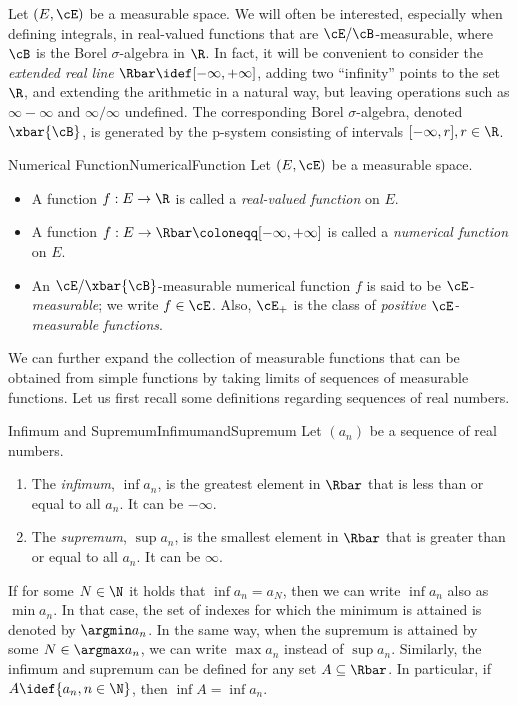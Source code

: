Let \((E, \cE)\) be a measurable space. We will often be interested, especially when defining integrals, in real-valued functions that are \(\cE/\cB\)-measurable, where \(\cB\) is the Borel \(\sigma\)-algebra in \(\R\). In fact, it will be convenient to consider the \textit{extended real line} \(\Rbar \idef [-\infty, +\infty]\), adding two ``infinity'' points to the set \(\R\), and extending the arithmetic in a natural way, but leaving operations such as \(\infty - \infty\) and \(\infty/\infty\) undefined. The corresponding Borel \(\sigma\)-algebra, denoted \(\xbar{\cB}\), is generated by the p-system consisting of intervals \([-\infty, r], r \in \R\).

\begin{defn}{Numerical Function}{NumericalFunction}
	Let \((E, \cE)\) be a measurable space.
	\begin{itemize}
		\item A function \(f : E \to \R\) is called a \textit{real-valued function} on \(E\).
		\item A function \(f : E \to \Rbar \coloneqq [-\infty, +\infty]\) is called a \textit{numerical function} on \(E\).
		\item An \(\cE/\xbar{\cB}\)-measurable numerical function \(f\) is said to be \textit{\(\cE\)-measurable}; we write \(f \in \cE\). Also, \(\cE_+\) is the class of \textit{positive \(\cE\)-measurable functions}.
	\end{itemize}
\end{defn}

We can further expand the collection of measurable functions that can be obtained from simple functions by taking limits of sequences of measurable functions. Let us first recall some definitions regarding sequences of real numbers.

\begin{defn}{Infimum and Supremum}{InfimumandSupremum}
	Let \((a_n)\) be a sequence of real numbers.
	\begin{enumerate}
		\item The \textit{infimum}, \(\inf a_n\), is the greatest element in \(\Rbar\) that is less than or equal to all \(a_n\). It can be \(-\infty\).
		\item The \textit{supremum}, \(\sup a_n\), is the smallest element in \(\Rbar\) that is greater than or equal to all \(a_n\). It can be \(\infty\).
	\end{enumerate}
\end{defn}

If for some \(N \in \N\) it holds that \(\inf a_n = a_N\), then we can write \(\inf a_n\) also as \(\min a_n\). In that case, the set of indexes for which the minimum is attained is denoted by \(\argmin a_n\). In the same way, when the supremum is attained by some \(N \in \argmax a_n\), we can write \(\max a_n\) instead of \(\sup a_n\). Similarly, the infimum and supremum can be defined for any set \(A \subseteq \Rbar\). In particular, if \(A \idef \{a_n, n \in \N\}\), then \(\inf A = \inf a_n\).

